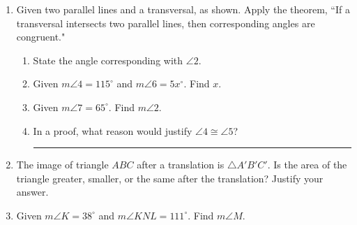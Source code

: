 \begin{enumerate}
\item Given two parallel lines and a transversal, as shown. Apply the theorem, ``If a transversal intersects two parallel lines, then corresponding angles are congruent."
  \begin{center}
  \end{center}
  \begin{enumerate}
    \item State the angle corresponding with $\angle 2$. \vspace{1cm}
    \item Given $m\angle 4 = 115^\circ$ and $m\angle 6 = 5x^\circ$. Find $x$. \vspace{3cm}
    \item Given $m\angle 7 = 65^\circ$. Find $m\angle 2$. \vspace{2cm}
    \item In a proof, what reason would justify $\angle 4 \cong \angle 5$? \rule{6cm}{0.15mm}
  \end{enumerate}

\item The image of triangle $ABC$ after a translation is $\triangle A'B'C'$. Is the area of the triangle greater, smaller, or the same after the translation? Justify your answer.

\newpage  
\item Given $m\angle K=38^\circ$ and $m\angle KNL=111^\circ$. Find $m\angle M$.\\[1cm]
 \vspace{3cm}


\end{enumerate}
